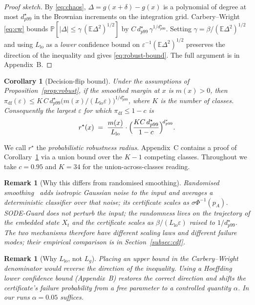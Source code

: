 \documentclass{ieeeaccess}
\newtheorem{corollary}[theorem]{Corollary}
\newtheorem{remark}[theorem]{Remark}
\newcommand{\Exp}{\mathbb{E}}
\newcommand{\Prob}{\mathbb{P}}
\begin{document}
\begin{proof}[Proof sketch]
By \eqref{eq:chaos}, $\Delta = g(x+\delta)-g(x)$ is a polynomial of
degree at most $d^\star_{p99}$ in the Brownian increments on the
integration grid. Carbery--Wright \eqref{eq:cw} bounds
$\Prob[|\Delta|\leq \gamma\,(\Exp\Delta^2)^{1/2}]$ by
$C\,d^\star_{p99}\,\gamma^{1/d^\star_{p99}}$. Setting
$\gamma = \beta/(\Exp\Delta^2)^{1/2}$ and using $L_{\mathrm{lo}}$ as a
\emph{lower} confidence bound on
$\varepsilon^{-1}(\Exp\Delta^2)^{1/2}$ preserves the direction of the
inequality and gives \eqref{eq:robust-bound}. The full argument is in
Appendix~B.
\end{proof}

\begin{corollary}[Decision-flip bound]\label{cor:argmax}
Under the assumptions of Proposition~\ref{prop:robust}, if the
smoothed margin at $x$ is $m(x)>0$, then
$\pi_{\mathrm{df}}(\varepsilon) \leq
 K\,C\,d^\star_{p99}\bigl(m(x)/(L_{\mathrm{lo}}\varepsilon)\bigr)^{1/d^\star_{p99}}$,
where $K$ is the number of classes. Consequently the largest
$\varepsilon$ for which $\pi_{\mathrm{df}}\leq 1-c$ is
\begin{equation}\label{eq:radius}
 r^{\star}(x)\;=\;\frac{m(x)}{L_{\mathrm{lo}}}\cdot
   \Bigl(\frac{KC\,d^\star_{p99}}{1-c}\Bigr)^{\!d^\star_{p99}}.
\end{equation}
\end{corollary}
\noindent We call $r^{\star}$ the \emph{probabilistic robustness
radius}. Appendix~C contains a proof of Corollary~\ref{cor:argmax} via
a union bound over the $K-1$ competing classes. Throughout we take
$c=0.95$ and $K=34$ for the union-across-classes reading.

\begin{remark}[Why this differs from randomised smoothing]
Randomised smoothing~\cite{cohen2019smoothing} adds isotropic Gaussian
noise to the input and averages a deterministic classifier over that
noise; its certificate scales as $\sigma\Phi^{-1}(p_A)$. SODE-Guard
does not perturb the input; the randomness lives on the trajectory of
the embedded state $X_t$ and the certificate scales as
$\beta/(L_{\mathrm{lo}}\varepsilon)$ raised to $1/d^\star_{p99}$. The
two mechanisms therefore have different scaling laws and different
failure modes; their empirical comparison is in
Section~\ref{subsec:cdf}.
\end{remark}

\begin{remark}[Why $L_{\mathrm{lo}}$, not $L_g$]
Placing an upper bound in the Carbery--Wright denominator would
\emph{reverse} the direction of the inequality. Using a Hoeffding
\emph{lower} confidence bound (Appendix~B) restores the correct
direction and shifts the certificate's failure probability from a
free parameter to a controlled quantity $\alpha$. In our runs
$\alpha=0.05$ suffices.
\end{remark}
\end{document}
